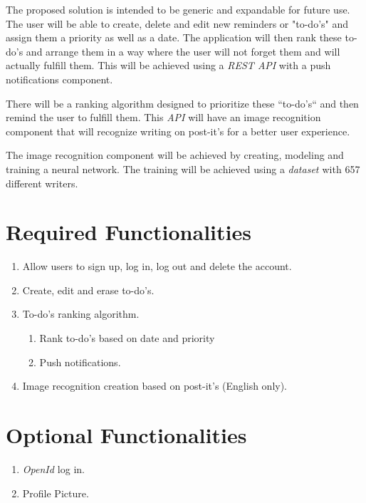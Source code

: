 \documentclass[12pt]{paper}
\begin{document}
		The proposed solution is intended to be generic and expandable for future use.
		The user will be able to create, delete and edit new reminders or "to-do's" and assign them a priority as well as a date. The application will then rank these to-do's and arrange them in a way where the user will not forget them and will actually fulfill them. This will be achieved using a \textit{REST \cite{rest}} \textit{API} with a push notifications component.
		
		There will be a ranking algorithm designed to prioritize these ``to-do's`` and then remind the user to fulfill them.
		This \textit{API} will have an image recognition component that will recognize writing on post-it's for a better user experience.
		
		The image recognition component will be achieved by creating, modeling and training a neural network\cite{neural-net}. The training will be achieved using a \textit{dataset \cite{dataset}} with 657 different writers.

	\setcounter{page}{2}
	\section{Required Functionalities}
		\begin{enumerate}
			\item Allow users to sign up, log in, log out and delete the account.
			\item Create, edit and erase to-do's.
			\item To-do's ranking algorithm.
			\begin{enumerate}
				\item Rank to-do's based on date and priority
				\item Push notifications.
			\end{enumerate}
			\item Image recognition creation based on post-it's (English only).
		\end{enumerate}
	
	\section{Optional Functionalities}
		\begin{enumerate}
			\item \textit{OpenId \cite{openid}} log in.
			\item Profile Picture.
		\end{enumerate}
\end{document}
